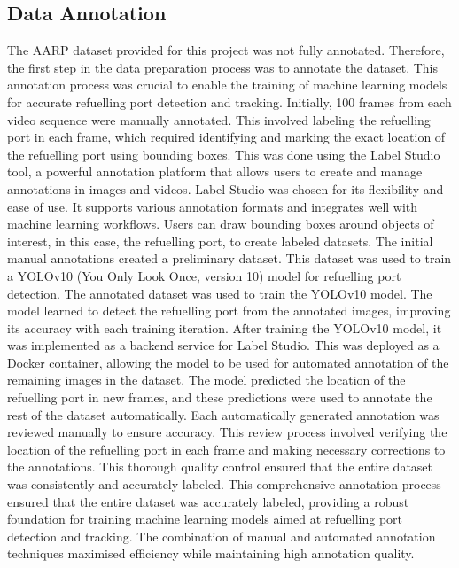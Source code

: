\documentclass[12pt,oneside]{book} %
\begin{document}
\newpage
\subsection{Data Annotation}
The AARP dataset provided for this project was not fully annotated. Therefore,
the first step in the data preparation process was to annotate the dataset.
This annotation process was crucial to enable the training of machine learning
models for accurate refuelling port detection and tracking. Initially, 100
frames from each video sequence were manually annotated. This involved labeling
the refuelling port in each frame, which required identifying and marking the
exact location of the refuelling port using bounding boxes. This was done using
the Label Studio tool, a powerful annotation platform that allows users to
create and manage annotations in images and videos. Label Studio was chosen for
its flexibility and ease of use. It supports various annotation formats and
integrates well with machine learning workflows. Users can draw bounding boxes
around objects of interest, in this case, the refuelling port, to create
labeled datasets. The initial manual annotations created a preliminary dataset.
This dataset was used to train a YOLOv10 (You Only Look Once, version 10) model
for refuelling port detection. The annotated dataset was used to train the
YOLOv10 model. The model learned to detect the refuelling port from the
annotated images, improving its accuracy with each training iteration. After
training the YOLOv10 model, it was implemented as a backend service for Label
Studio. This was deployed as a Docker container, allowing the model to be used
for automated annotation of the remaining images in the dataset. The model
predicted the location of the refuelling port in new frames, and these
predictions were used to annotate the rest of the dataset automatically. Each
automatically generated annotation was reviewed manually to ensure accuracy.
This review process involved verifying the location of the refuelling port in
each frame and making necessary corrections to the annotations. This thorough
quality control ensured that the entire dataset was consistently and accurately
labeled. This comprehensive annotation process ensured that the entire dataset
was accurately labeled, providing a robust foundation for training machine
learning models aimed at refuelling port detection and tracking. The
combination of manual and automated annotation techniques maximised efficiency
while maintaining high annotation quality. 

\newpage
\end{document}
